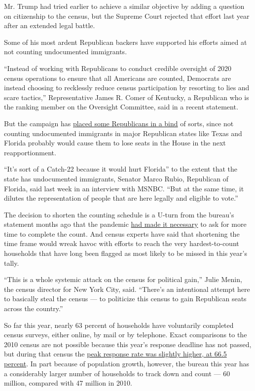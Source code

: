 Mr. Trump had tried earlier to achieve a similar objective by adding a
question on citizenship to the census, but the Supreme Court rejected
that effort last year after an extended legal battle.

Some of his most ardent Republican backers have supported his efforts
aimed at not counting undocumented immigrants.

``Instead of working with Republicans to conduct credible oversight of
2020 census operations to ensure that all Americans are counted,
Democrats are instead choosing to recklessly reduce census participation
by resorting to lies and scare tactics,'' Representative James R. Comer
of Kentucky, a Republican who is the ranking member on the Oversight
Committee, said in a recent statement.

But the campaign has
\href{https://www.msn.com/en-us/news/politics/trump-s-census-memo-puts-some-republicans-in-catch-22/ar-BB17gKkQ}{placed
some Republicans in a bind} of sorts, since not counting undocumented
immigrants in major Republican states like Texas and Florida probably
would cause them to lose seats in the House in the next reapportionment.

``It's sort of a Catch-22 because it would hurt Florida'' to the extent
that the state has undocumented immigrants, Senator Marco Rubio,
Republican of Florida, said last week in an interview with MSNBC. ``But
at the same time, it dilutes the representation of people that are here
legally and eligible to vote.''

The decision to shorten the counting schedule is a U-turn from the
bureau's statement months ago that the pandemic
\href{https://www.nytimes3xbfgragh.onion/2020/04/13/us/census-coronavirus-delay.html?searchResultPosition=12}{had
made it necessary} to ask for more time to complete the count. And
census experts have said that shortening the time frame would wreak
havoc with efforts to reach the very hardest-to-count households that
have long been flagged as most likely to be missed in this year's tally.

``This is a whole systemic attack on the census for political gain,''
Julie Menin, the census director for New York City, said. ``There's an
intentional attempt here to basically steal the census --- to politicize
this census to gain Republican seats across the country.''

So far this year, nearly 63 percent of households have voluntarily
completed census surveys, either online, by mail or by telephone. Exact
comparisons to the 2010 census are not possible because this year's
response deadline has not passed, but during that census the
\href{https://www.politifact.com/factchecks/2020/jul/31/stacey-abrams/fact-checking-stacey-abrams-comparison-census-resp/}{peak
response rate was slightly higher, at 66.5 percent}. In part because of
population growth, however, the bureau this year has a considerably
larger number of households to track down and count --- 60 million,
compared with 47 million in 2010.


